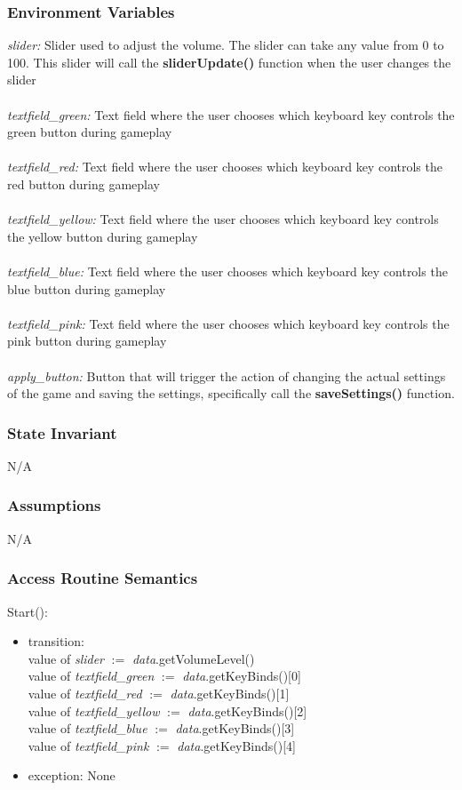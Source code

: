 \documentclass[12pt]{article}
\begin{document}
\subsubsection {Environment Variables}
\textit{slider:} Slider used to adjust the volume. The slider can take any value from 0 to 100. This slider will call the \textbf{sliderUpdate()} function when the user changes the slider\\\\
\textit{textfield\_green:} Text field where the user chooses which keyboard key controls the green button during gameplay\\\\
\textit{textfield\_red:} Text field where the user chooses which keyboard key controls the red button during gameplay\\\\
\textit{textfield\_yellow:} Text field where the user chooses which keyboard key controls the yellow button during gameplay\\\\
\textit{textfield\_blue:} Text field where the user chooses which keyboard key controls the blue button during gameplay\\\\
\textit{textfield\_pink:} Text field where the user chooses which keyboard key controls the pink button during gameplay\\\\
\textit{apply\_button:} Button that will trigger the action of changing the actual settings of the game and saving the settings, specifically call the \textbf{saveSettings()} function.
\subsubsection {State Invariant}
N/A
\subsubsection {Assumptions}
N/A
\subsubsection {Access Routine Semantics}

\noindent Start():
\begin{itemize}
	\item transition: \\
	value of \textit{slider} $:=$ \textit{data}.getVolumeLevel()\\
	value of \textit{textfield\_green} $:=$ \textit{data}.getKeyBinds()[0]\\
	value of \textit{textfield\_red} $:=$ \textit{data}.getKeyBinds()[1]\\
	value of \textit{textfield\_yellow} $:=$ \textit{data}.getKeyBinds()[2]\\
	value of \textit{textfield\_blue} $:=$ \textit{data}.getKeyBinds()[3]\\
	value of \textit{textfield\_pink} $:=$ \textit{data}.getKeyBinds()[4]\\
	\item exception: None
\end{itemize}
\end{document}
